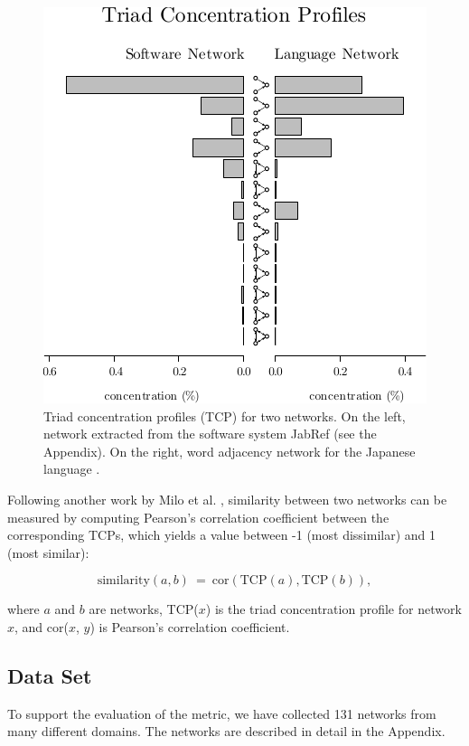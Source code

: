 \begin{figure}[!t]
\center
\includegraphics{tcp}
\caption{Triad concentration profiles (TCP) for two networks. On the left,
network extracted from the software system JabRef (see the Appendix). On the
right, word adjacency network for the Japanese language \cite{Milo2004}.}
\label{fig:profiles}
\end{figure}

Following another work by Milo et al. \cite{Milo2004}, similarity between two
networks can be measured by computing Pearson's correlation coefficient between
the corresponding TCPs, which yields a value between -1 (most dissimilar) and 1
(most similar):

$$
\mathrm{similarity}(a, b) ~=~ 
  \mathrm{cor}(\mathrm{TCP}(a), \mathrm{TCP}(b))\mathrm{,}
$$

where $a$ and $b$ are networks, TCP($x$) is the triad concentration profile for
network $x$, and cor($x$, $y$) is Pearson's correlation coefficient.

\subsection{Data Set}

To support the evaluation of the metric, we have collected 131 networks from
many different domains. The networks are described in detail in the Appendix.

